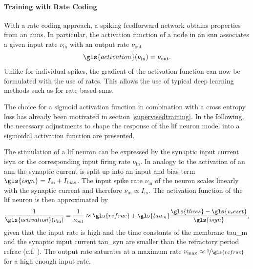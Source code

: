 \paragraph{Training with Rate Coding}
With a rate coding approach, a spiking feedforward network obtains properties from an \glspl{ann}. In particular, the activation function of a node in an \gls{snn} associates a given input rate $\nu_{\text{in}}$ with an output rate $\nu_{\text{out}}$ 
\begin{equation*}
	\gls{activation}(\nu_{\text{in}}) = \nu_\text{out}.
\end{equation*}
Unlike for individual spikes, the gradient of the activation function can now be formulated with the use of rates.  This allows the use of typical deep learning methods such as  for rate-based \glspl{snn}.
 

The choice for a sigmoid activation function in combination with a cross entropy loss has already been motivated in section \cref{supervisedtraining}. In the following, the necessary adjustments to shape the response of the \gls{lif} neuron model into a sigmoidal activation function are presented.

The stimulation of a \gls{lif} neuron can be expressed by the synaptic input current \gls{isyn} or the corresponding input firing rate $\nu_\text{in}$. In analogy to the activation of an \gls{ann} the synaptic current is split up into an input and bias term $\gls{isyn} = I_\text{in} + I_\text{bias}$. The input spike rate $\nu_\text{in}$ of the neuron scales linearly with the synaptic current and therefore $\nu_\text{in} \propto I_\text{in}$. The activation function of the \gls{lif} neuron is then approximated by 
\begin{equation}
\frac{1}{\gls{activation}(\nu_\text{in})} = \frac{1}{\nu_\text{out}} \approx \gls{refrac} + \gls{tau_m} \frac{\gls{thres} - \gls{v_reset}}{\gls{isyn}},
\label{fireratehigh}
\end{equation}
given that the input rate is high and the time constants of the membrane \gls{tau_m} and the synaptic input current \gls{tau_syn} are smaller than the refractory period \gls{refrac} (c.f. \citealp{brunel2000dynamics}). The output rate saturates at a maximum rate $\nu_\text{max} \approx \nicefrac{1}{\gls{refrac}}$ for a high enough input rate.

